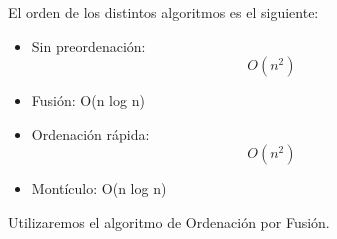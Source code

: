 El orden de los distintos algoritmos es el siguiente:

\begin{itemize}
    \item Sin preordenación: $$O(n^2)$$
    \item Fusión: O(n log n)
    \item Ordenación rápida: $$O(n^2)$$
    \item Montículo: O(n log n)
\end{itemize}

Utilizaremos el algoritmo de Ordenación por Fusión. 